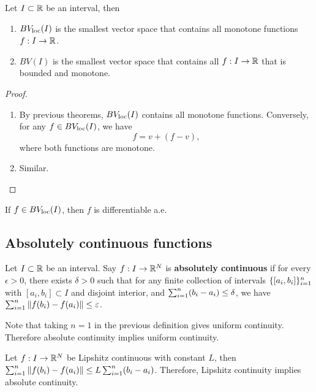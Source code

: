 \documentclass[a4paper]{article}
\begin{document}
\begin{cor}
  Let $I \subset \mathbb{R}$ be an interval, then
  \begin{enumerate}
    \item $BV_{\mathrm{loc}} (I)$ is the smallest vector space that contains all
          monotone functions $f : I \to \mathbb{R}$.

    \item $BV (I)$ is the smallest vector space that contains all $f : I
            \to \mathbb{R}$ that is bounded and monotone.
  \end{enumerate}
\end{cor}

\begin{proof}
  \begin{enumerate}
    \item By previous theorems, $BV_{\mathrm{loc}} (I)$ contains all monotone
          functions. Conversely, for any $f \in BV_{\mathrm{loc}} (I)$, we have
          \[
            f = v + (f - v),
          \]
          where both functions are monotone.
    \item Similar.
  \end{enumerate}
\end{proof}

\begin{cor}
  If $f \in BV_{\mathrm{loc}} (I)$, then $f$ is differentiable a.e.
\end{cor}

\subsection{Absolutely continuous functions}

\begin{defi}
  Let $I \subset \mathbb{R}$ be an interval. Say $f : I \to \mathbb{R}^N$ is
  \textbf{absolutely continuous} if for every $\epsilon > 0$, there exists
  $\delta > 0$ such that for any finite collection of intervals
  $\{ [a_i, b_i] \}_{i=1}^n$ with $[a_i, b_i] \subset I$ and disjoint interior,
  and $\sum_{i=1}^n (b_i - a_i) \leq \delta$, we have $\sum_{i=1}^n \left\lVert f(b_i) -
      f(a_i)\right\rVert \leq \varepsilon$.
\end{defi}

\begin{remark}
  Note that taking $n = 1$ in the previous definition gives uniform
  continuity. Therefore absolute continuity implies uniform continuity.
\end{remark}

\begin{eg}
  Let $f : I \to \mathbb{R}^N$ be Lipshitz continuous with constant $L$, then
  $\sum_{i=1}^n \left\lVert f(b_i) - f(a_i)\right\rVert \leq L \sum_{i=1}^n (b_i - a_i)$. Therefore,
  Lipshitz continuity implies absolute continuity.
\end{eg}
\end{document}
